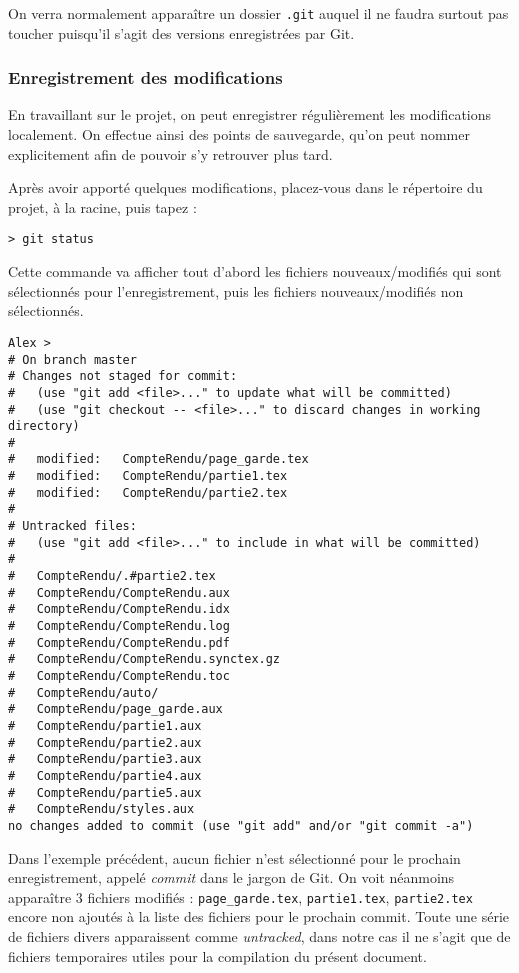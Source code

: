 \par On verra normalement apparaître un dossier \texttt{.git} auquel il ne faudra surtout pas toucher puisqu'il s'agit des versions enregistrées par Git.

\subsubsection{Enregistrement des modifications}
\label{sec:enreg-des-modif}

\par En travaillant sur le projet, on peut enregistrer régulièrement les modifications localement. On effectue ainsi des points de sauvegarde, qu'on peut nommer explicitement afin de pouvoir s'y retrouver plus tard.
\par Après avoir apporté quelques modifications, placez-vous dans le répertoire du projet, à la racine, puis tapez :
\begin{verbatim}
> git status
\end{verbatim}
 \par Cette commande va afficher tout d'abord les fichiers nouveaux/modifiés qui sont sélectionnés pour l'enregistrement, puis les fichiers nouveaux/modifiés non sélectionnés. 

\begin{verbatim}
Alex > 
# On branch master
# Changes not staged for commit:
#   (use "git add <file>..." to update what will be committed)
#   (use "git checkout -- <file>..." to discard changes in working directory)
#
#	modified:   CompteRendu/page_garde.tex
#	modified:   CompteRendu/partie1.tex
#	modified:   CompteRendu/partie2.tex
#
# Untracked files:
#   (use "git add <file>..." to include in what will be committed)
#
#	CompteRendu/.#partie2.tex
#	CompteRendu/CompteRendu.aux
#	CompteRendu/CompteRendu.idx
#	CompteRendu/CompteRendu.log
#	CompteRendu/CompteRendu.pdf
#	CompteRendu/CompteRendu.synctex.gz
#	CompteRendu/CompteRendu.toc
#	CompteRendu/auto/
#	CompteRendu/page_garde.aux
#	CompteRendu/partie1.aux
#	CompteRendu/partie2.aux
#	CompteRendu/partie3.aux
#	CompteRendu/partie4.aux
#	CompteRendu/partie5.aux
#	CompteRendu/styles.aux
no changes added to commit (use "git add" and/or "git commit -a")
\end{verbatim}

\par Dans l'exemple précédent, aucun fichier n'est sélectionné pour le prochain enregistrement, appelé \emph{commit} dans le jargon de Git. On voit néanmoins apparaître 3 fichiers modifiés : \texttt{page\_garde.tex}, \texttt{partie1.tex}, \texttt{partie2.tex} encore non ajoutés à la liste des fichiers pour le prochain commit. Toute une série de fichiers divers apparaissent comme \emph{untracked}, dans notre cas il ne s'agit que de fichiers temporaires utiles pour la compilation du présent document. 

